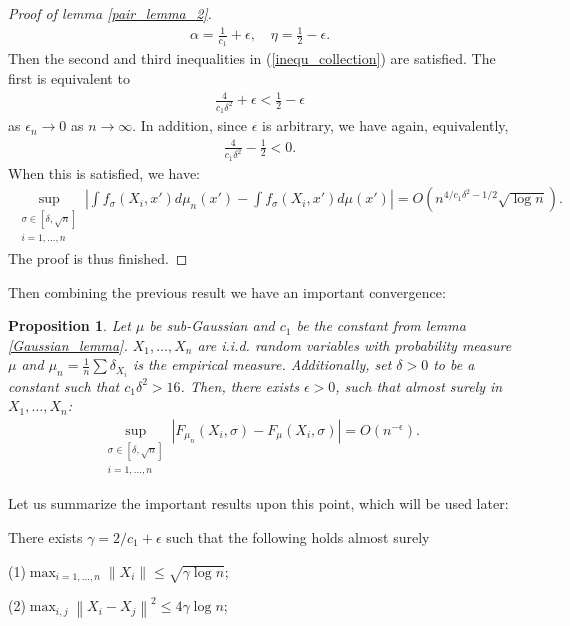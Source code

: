 \documentclass[10pt]{article}
\newcommand{\norm}[1]{\left\lVert#1\right\rVert}
\newtheorem{proposition}{\bf Proposition}
\newenvironment{Proof of lemma}{\noindent{\bf Proof of Lemma}}{\hfill$\Box$\newline}
\newenvironment{Proof of claim}{\noindent{\bf Proof of claim}}{\hfill$\Box$\newline}
\newenvironment{Proof of theorem}{\noindent{\bf Proof of Theorem}}{\hfill\scriptsize{$\Box$}\newline}
\newenvironment{Proof of theorems}{\noindent{\bf Proof of Theorems}}{\hfill$\Box$\newline}
\newenvironment{Proof of proposition}{\noindent{\bf Proof of Proposition}}{\hfill$\Box$\newline}
\newenvironment{Proof of propositions}{\noindent{\bf Proof of Propositions}}{\hfill$\Box$\newline}
\newenvironment{Proof of exercise}{\noindent{\it Proof of Exercise:}}{\hfill$\Box$}
\numberwithin{equation}{section}
\begin{document}
\begin{proof}[Proof of lemma \ref{pair_lemma_2}]
    \begin{align}
        \alpha = \frac{1}{c_1}+\epsilon, \quad \eta = \frac{1}{2} - \epsilon.
    \end{align}
    Then the second and third inequalities in (\ref{inequ_collection}) are satisfied. The first is equivalent to
    \begin{align}
        \frac{4}{c_1 \delta^2}+\epsilon<\frac{1}{2}-\epsilon
    \end{align}
    as $\epsilon_n \to 0$ as $n \to \infty$. In addition, since $\epsilon$ is arbitrary, we have again, equivalently,
    \begin{align}
        \frac{4}{c_1 \delta^2} - \frac{1}{2}<0.
    \end{align}
    When this is satisfied, we have:
    \begin{align}
        \sup_{\substack{\sigma \in [\delta,\sqrt{n}] \\ i = 1,\dots,n}} \left|\int f_{\sigma}(X_i,x')d\mu_n (x')-\int f_{\sigma}(X_i,x')d\mu (x')\right| =O(n^{4/c_1\delta^2 -1/2}\sqrt{\log n}).
    \end{align}
    The proof is thus finished.
\end{proof}
Then combining the previous result we have an important convergence:
\begin{proposition}
    Let $\mu$ be sub-Gaussian and $c_1$ be the constant from lemma \ref{Gaussian_lemma}. $X_1,\dots, X_n$ are i.i.d. random variables with probability measure $\mu$ and $\mu_n = \frac{1}{n} \sum \delta_{X_i}$ is the empirical measure. Additionally, set $\delta>0$ to be a constant such that $c_1 \delta^2>16$. Then, there exists $\epsilon>0$, such that almost surely in $X_1,\dots,X_n$:
    \begin{align}
        \sup_{\substack{\sigma \in [\delta,\sqrt{n}] \\i=1,\dots,n}}|F_{\mu_n}(X_i,\sigma)-F_{\mu}(X_i,\sigma)| = O(n^{-\epsilon}).
    \end{align}
\end{proposition}
Let us summarize the important results upon this point, which will be used later:

There exists $\gamma = 2/c_1 +\epsilon$ such that the following holds almost
surely

(1)$\max_{i=1,\dots,n}\norm{X_i} \leq \sqrt{\gamma \log n}$;

(2)$\max_{i,j}\norm{X_i-X_j}^2 \leq 4 \gamma \log n$;
\end{document}
